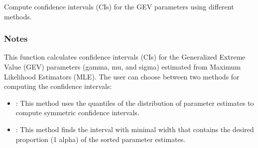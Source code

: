 \documentclass[a4paper,11pt,openany,english]{sphinxmanual}
\begin{document}
\begin{fulllineitems}
\begin{sphinxVerbatim}[commandchars=\\\{\}]
\end{sphinxVerbatim}

\begin{fulllineitems}
\label{\detokenize{api_topt:xtremes.topt.ML_estimators.get_CIs}}
\pysigstartsignatures
{}
\pysigstopsignatures
\sphinxAtStartPar
Compute confidence intervals (CIs) for the GEV parameters using different methods.


\subsubsection{Notes}
\label{\detokenize{api_topt:id51}}
\sphinxAtStartPar
This function calculates confidence intervals (CIs) for the Generalized Extreme Value (GEV) parameters (gamma, mu, and sigma) 
estimated from Maximum Likelihood Estimators (MLE). The user can choose between two methods for computing the confidence intervals:
\begin{itemize}
\item {} 
\sphinxAtStartPar
{}: This method uses the quantiles of the distribution of parameter estimates to compute symmetric confidence intervals.

\item {} 
\sphinxAtStartPar
{}: This method finds the interval with minimal width that contains the desired proportion (1 \sphinxhyphen{} alpha) of the sorted parameter estimates.


\end{itemize}
\end{fulllineitems}
\end{fulllineitems}
\end{document}
